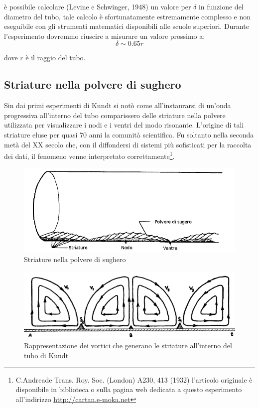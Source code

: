 \documentclass[a4paper,10pt,oneside]{article}
\begin{document}
è possibile calcolare (Levine  e Schwinger, 1948) un valore per $\delta$ in funzione del diametro del tubo, tale calcolo è sfortunatamente estremamente complesso e non eseguibile con gli strumenti matematici disponibili alle scuole superiori. 
Durante l'esperimento dovremmo riuscire a misurare un valore prossimo a:
\begin{equation}
 \delta\sim 0.65r
\end{equation}

dove $r$ è il raggio del tubo.

\subsection{Striature nella polvere di sughero}

Sin dai primi esperimenti di Kundt si notò come all'instaurarsi di un'onda progressiva all'interno del tubo comparissero delle striature nella polvere utilizzata per visualizzare i nodi e i ventri del modo risonante. L'origine di tali striature eluse per quasi 70 anni la comunità scientifica. Fu soltanto nella seconda metà del XX secolo che, con il diffondersi di sistemi più sofisticati per la raccolta dei dati, il fenomeno venne interpretato correttamente\footnote{C.Andreade Trans. Roy. Soc. (London) A230, 413 (1932) l'articolo originale è disponibile in biblioteca o sulla pagina web dedicata a questo esperimento all'indirizzo \url{http://cartan.e-moka.net}}.

\begin{figure}[H]
 \centering
 \includegraphics[width=\textwidth]{../Immagini/cork1.png}
 \caption{Striature nella polvere di sughero}
 \label{fig:cork1}
\end{figure}

\begin{figure}[H]
 \centering
 \includegraphics[width=\textwidth]{../Immagini/cork2.png}
 \caption{Rappresentazione dei vortici che generano le striature all'interno del tubo di Kundt}
 \label{fig:cork2}
\end{figure}
\end{document}
